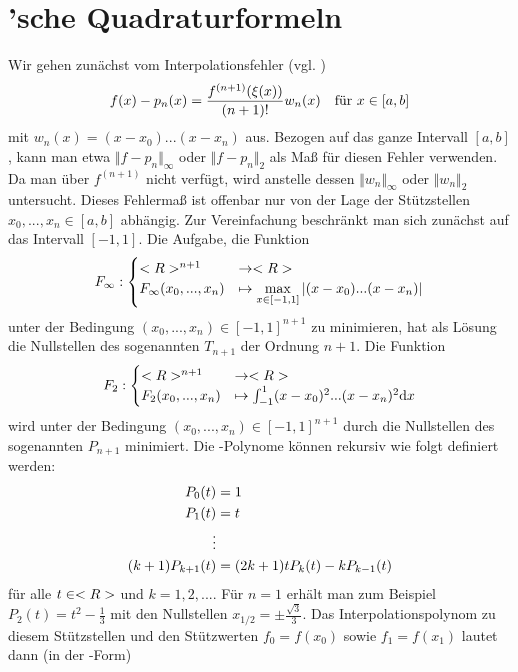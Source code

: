 \section{'sche Quadraturformeln}

Wir gehen zunächst vom Interpolationsfehler (vgl. )
\begin{align}
	f(x)-p_n(x) = \frac{f^{(n+1)}(\xi(x))}{(n+1)!}w_n(x)\quad\text{für } x\in [a,b]\notag
\end{align}
mit $w_n(x)=(x-x_0)...(x-x_n)$ aus. Bezogen auf das ganze Intervall $[a,b]$, kann man etwa $\Vert f-p_n\Vert_\infty$ oder $\Vert f-p_n\Vert_2$ als Maß für diesen Fehler verwenden. Da man über $f^{(n+1)}$ nicht verfügt, wird anstelle dessen $\Vert w_n\Vert_\infty$ oder $\Vert w_n\Vert_2$ untersucht. Dieses Fehlermaß ist offenbar nur von der Lage der Stützstellen $x_0,...,x_n\in [a,b]$ abhängig. Zur Vereinfachung beschränkt man sich zunächst auf das Intervall $[-1,1]$. Die Aufgabe, die Funktion
\begin{align}
	F_\infty :\begin{cases}
		<R>^{n+1}&\to <R> \\
		F_\infty(x_0,...,x_n) &\mapsto \max\limits_{x\in [-1,1]} \vert (x-x_0)...(x-x_n)\vert
	\end{cases}\notag
\end{align}
unter der Bedingung $(x_0,...,x_n)\in [-1,1]^{n+1}$ zu minimieren, hat als Lösung die Nullstellen des sogenannten  $T_{n+1}$ der Ordnung $n+1$. Die Funktion
\begin{align}
	F_2:\begin{cases}
		<R>^{n+1} &\to <R> \\
		F_2(x_0,...,x_n) &\mapsto \int_{-1}^{1} (x-x_0)^2...(x-x_n)^2\mathrm{d} x
	\end{cases}\notag
\end{align}
wird unter der Bedingung $(x_0,...,x_n)\in [-1,1]^{n+1}$ durch die Nullstellen des sogenannten  $P_{n+1}$ minimiert. Die -Polynome können rekursiv wie folgt definiert werden:
\begin{align}
	P_0(t) &= 1 \notag \\
	P_1(t) &= t \notag \\
	\vdots \notag \\
	(k+1)P_{k+1}(t) &= (2k+1)tP_k(t)-kP_{k-1}(t)\notag
\end{align}
für alle $t\in<R>$ und $k=1,2,...$. Für $n=1$ erhält man zum Beispiel $P_2(t)=t^2-\frac{1}{3}$ mit den Nullstellen $x_{1/2}=\pm \frac{\sqrt{3}}{3}$. Das Interpolationspolynom zu diesem Stützstellen und den Stützwerten $f_0=f(x_0)$ sowie $f_1=f(x_1)$ lautet dann (in der -Form)
